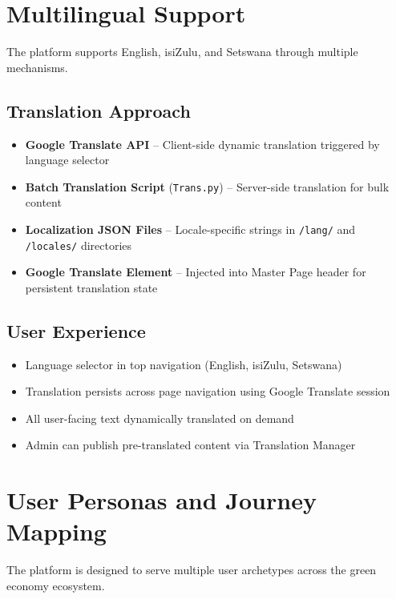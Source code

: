 \documentclass[a4paper,12pt]{article}
\begin{document}
\section{Multilingual Support}
The platform supports English, isiZulu, and Setswana through multiple mechanisms.

\subsection{Translation Approach}
\begin{itemize}
    \item \textbf{Google Translate API} – Client-side dynamic translation triggered by language selector
    \item \textbf{Batch Translation Script} (\texttt{Trans.py}) – Server-side translation for bulk content
    \item \textbf{Localization JSON Files} – Locale-specific strings in \texttt{/lang/} and \texttt{/locales/} directories
    \item \textbf{Google Translate Element} – Injected into Master Page header for persistent translation state
\end{itemize}

\subsection{User Experience}
\begin{itemize}
    \item Language selector in top navigation (English, isiZulu, Setswana)
    \item Translation persists across page navigation using Google Translate session
    \item All user-facing text dynamically translated on demand
    \item Admin can publish pre-translated content via Translation Manager
\end{itemize}

\section{User Personas and Journey Mapping}
The platform is designed to serve multiple user archetypes across the green economy ecosystem.
\end{document}
